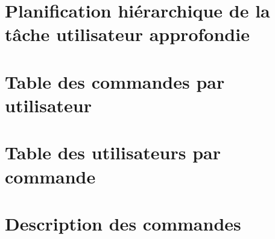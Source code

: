 \part{Planification hiérarchique de la tâche utilisateur approfondie}

\part{Table des commandes par utilisateur}

\part{Table des utilisateurs par commande}

\part{Description des commandes}

